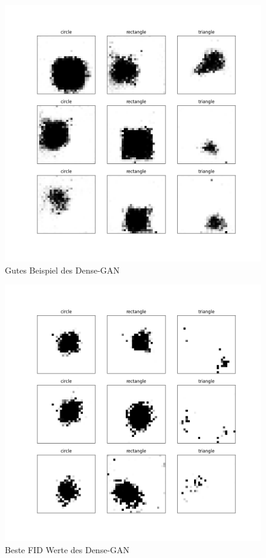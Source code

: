 \begin{figure}[H]
	\centering
	\includegraphics[height=0.4\textheight]{kapitel/5_ergebnisse/densegan/good_example.png}
	\caption{Gutes Beispiel des Dense-GAN}
	\label{ergebnis:densegan-good-example}
\end{figure}

\begin{figure}[H]
	\centering
	\includegraphics[height=0.4\textheight]{kapitel/5_ergebnisse/densegan/best_fid.png}
	\caption{Beste FID Werte des Dense-GAN}
	\label{ergebnis:densegan-best-fid}
\end{figure}

